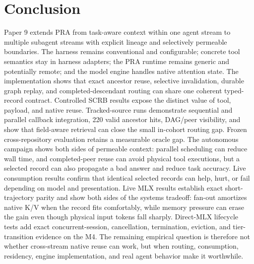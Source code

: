 \documentclass[11pt]{article}
\begin{document}
\section{Conclusion}

Paper 9 extends PRA from task-aware context within one agent stream to multiple
subagent streams with explicit lineage and selectively permeable boundaries.
The harness remains conventional and configurable; concrete tool semantics stay
in harness adapters; the PRA runtime remains generic and potentially remote;
and the model engine handles native attention state. The implementation shows
that exact ancestor reuse, selective invalidation, durable graph replay, and
completed-descendant routing can share one coherent typed-record contract.
Controlled SCRB results expose the distinct value of tool, payload, and native
reuse. Tracked-source runs demonstrate sequential and parallel callback
integration, 220 valid ancestor hits, DAG/peer visibility, and show that
field-aware retrieval can close the small in-cohort routing gap. Frozen
cross-repository evaluation retains a measurable oracle gap. The autonomous
campaign shows both sides of permeable context: parallel scheduling can reduce
wall time, and completed-peer reuse can avoid physical tool executions, but a
selected record can also propagate a bad answer and reduce task accuracy. Live
consumption results confirm that identical selected records can help, hurt, or
fail depending on model and presentation. Live MLX results establish exact
short-trajectory parity and show both sides of the
systems tradeoff: fan-out amortizes native K/V when the record fits comfortably,
while memory pressure can erase the gain even though physical input tokens fall
sharply. Direct-MLX lifecycle tests add exact concurrent-session, cancellation,
termination, eviction, and tier-transition evidence on the M4. The remaining
empirical question is therefore not whether cross-stream native reuse can work,
but when routing, consumption, residency, engine implementation, and real agent
behavior make it worthwhile.



\end{document}

